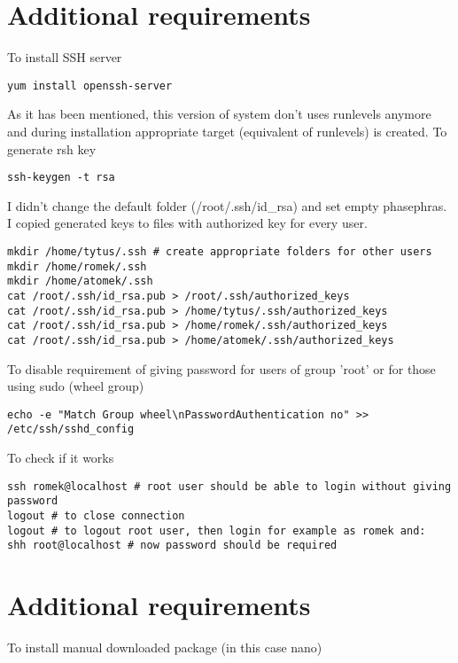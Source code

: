 \documentclass[a4paper,12pt]{article}
\begin{document}
    \section{Additional requirements}
    To install SSH server
    \begin{lstlisting}[frame=single]
yum install openssh-server
    \end{lstlisting}
    As it has been mentioned, this version of system don't uses runlevels anymore and during installation appropriate target (equivalent of runlevels) is created. To generate rsh key
    \begin{lstlisting}[frame=single]
ssh-keygen -t rsa
    \end{lstlisting}
    I didn't change the default folder (/root/.ssh/id\_rsa) and set empty phasephras. I copied generated keys to files with authorized key for every user.
    \begin{lstlisting}[frame=single]
mkdir /home/tytus/.ssh # create appropriate folders for other users
mkdir /home/romek/.ssh 
mkdir /home/atomek/.ssh
cat /root/.ssh/id_rsa.pub > /root/.ssh/authorized_keys
cat /root/.ssh/id_rsa.pub > /home/tytus/.ssh/authorized_keys
cat /root/.ssh/id_rsa.pub > /home/romek/.ssh/authorized_keys
cat /root/.ssh/id_rsa.pub > /home/atomek/.ssh/authorized_keys
    \end{lstlisting}
    To disable requirement of giving password for users of group 'root' or for those using sudo (wheel group)
    \begin{lstlisting}[frame=single]
echo -e "Match Group wheel\nPasswordAuthentication no" >> /etc/ssh/sshd_config
    \end{lstlisting}
    To check if it works 
    \begin{lstlisting}[frame=single]
ssh romek@localhost # root user should be able to login without giving password
logout # to close connection
logout # to logout root user, then login for example as romek and:
shh root@localhost # now password should be required
    \end{lstlisting}

    \section{Additional requirements}
    To install manual downloaded package (in this case nano)  
\end{document}

